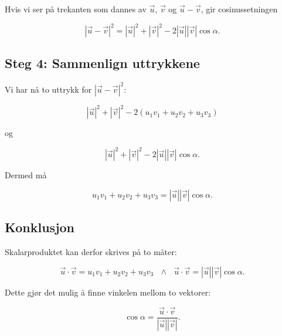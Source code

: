 \documentclass[a4paper,12pt]{article}
\begin{document}
Hvis vi ser på trekanten som dannes av $\vec u$, $\vec v$ og $\vec u-\vec v$, gir cosinussetningen

\[
|\vec u-\vec v|^2 =
|\vec u|^2 + |\vec v|^2 - 2|\vec u||\vec v|\cos\alpha.
\]

\begin{figure}[h]
\centering
{}

\end{figure}

\subsection*{Steg 4: Sammenlign uttrykkene}

Vi har nå to uttrykk for $|\vec u-\vec v|^2$:

\[
|\vec u|^2 + |\vec v|^2 - 2(u_1v_1+u_2v_2+u_3v_3)
\]

og

\[
|\vec u|^2 + |\vec v|^2 - 2|\vec u||\vec v|\cos\alpha.
\]

Dermed må

\[
u_1v_1+u_2v_2+u_3v_3
=
|\vec u||\vec v|\cos\alpha. \tag*{\qed}
\]

\subsection*{Konklusjon}

Skalarproduktet kan derfor skrives på to måter:

\[
\vec u\cdot\vec v
=
u_1v_1+u_2v_2+u_3v_3\,\,\,\,
\land\,\,\,\,
\vec u\cdot\vec v
=
|\vec u||\vec v|\cos\alpha.
\]

Dette gjør det mulig å finne vinkelen mellom to vektorer:

\[
\cos\alpha =
\frac{\vec u\cdot\vec v}{|\vec u||\vec v|}.
\]
\end{document}
